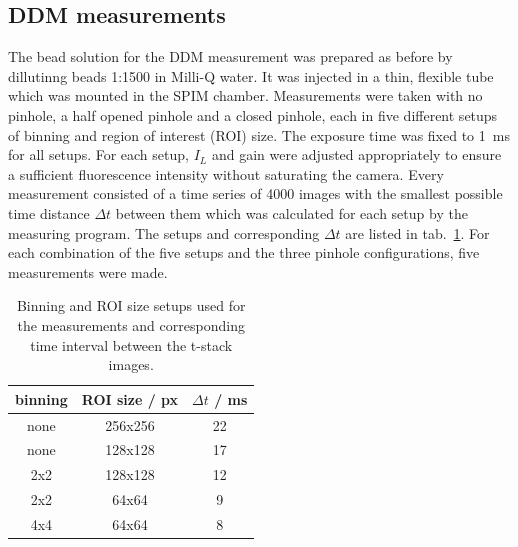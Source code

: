 \subsection*{DDM measurements}
The bead solution for the DDM measurement was prepared as before by dillutinng beads 1:1500 in Milli-Q water. It was injected in a thin, flexible tube which was mounted in the SPIM chamber. Measurements were taken with no pinhole, a half opened pinhole and a closed pinhole, each in five different setups of binning and region of interest (ROI) size. The exposure time was fixed to \SI{1}{\milli\second} for all setups. For each setup, $I_L$ and gain were adjusted appropriately to ensure a sufficient fluorescence intensity without saturating the camera. Every measurement consisted of a time series of \num{4000} images with the smallest possible time distance $\Delta t$ between them which was calculated for each setup by the measuring program. The setups and corresponding $\Delta t$ are listed in tab.~\ref{tab:setups}. For each combination of the five setups and the three pinhole configurations, five measurements were made. 

\begin{table}
    \centering
    \begin{tabular}{c c c}
        \toprule
        binning & ROI size / px & $\Delta t$ / \si{\milli\second} \\
        \midrule
        none & 256x256 & 22 \\
        none & 128x128 & 17 \\
        2x2 & 128x128 & 12 \\
        2x2 & 64x64 & 9 \\
        4x4 & 64x64 & 8 \\
        \bottomrule
    \end{tabular}
    \caption{Binning and ROI size setups used for the measurements and corresponding time interval between the t-stack images.}
    \label{tab:setups}
\end{table}